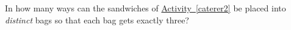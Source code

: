 \documentclass{book}
\begin{document}
\setcounter{project}{280}
\addtocounter{project}{-1}
\begin{activity}[]\label{activity-273}
\hypertarget{p-1464}{}%
In how many ways can the sandwiches of \hyperref[caterer2]{Activity~\ref{caterer2}} be placed into \emph{distinct} bags so that each bag gets exactly three?%
\end{activity}
\end{document}
